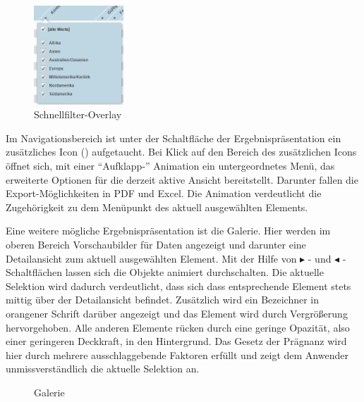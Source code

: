 \begin{figure}[H]
 \centering
 \includegraphics[width=0.3\textwidth]{grafiken/overlay.png}
 \caption{Schnellfilter-Overlay}
 \label{fig:autofilter}
\end{figure}
Im Navigationsbereich ist unter der Schaltfläche der Ergebnispräsentation ein zusätzliches Icon () aufgetaucht. Bei Klick auf den Bereich des zusätzlichen Icons öffnet sich, mit einer \enquote{Aufklapp-} Animation ein untergeordnetes Menü, das erweiterte Optionen für die derzeit aktive Ansicht bereitstellt. Darunter fallen die Export-Möglichkeiten in PDF und Excel. Die Animation verdeutlicht die Zugehörigkeit zu dem Menüpunkt des aktuell ausgewählten Elements.\par%
Eine weitere mögliche Ergebnispräsentation ist die Galerie. Hier werden im oberen Bereich Vorschaubilder für Daten angezeigt und darunter eine Detailansicht zum aktuell ausgewählten Element. Mit der Hilfe von $\blacktriangleright$ - und $\blacktriangleleft$ - Schaltflächen lassen sich die Objekte animiert durchschalten. Die aktuelle Selektion wird dadurch verdeutlicht, dass sich dass entsprechende Element stets mittig über der Detailansicht befindet. Zusätzlich wird ein Bezeichner in orangener Schrift darüber angezeigt und das Element wird durch Vergrößerung hervorgehoben. Alle anderen Elemente rücken durch eine geringe Opazität, also einer geringeren Deckkraft, in den Hintergrund. Das Gesetz der Prägnanz wird hier durch mehrere ausschlaggebende Faktoren erfüllt und zeigt dem Anwender unmissverständlich die aktuelle Selektion an.\par
\begin{figure}[H]
 \centering
 \setlength{\fboxsep}{0pt}
 \setlength{\fboxrule}{0.5pt}
 \caption{Galerie}
 \label{fig:gallery}
\end{figure}
